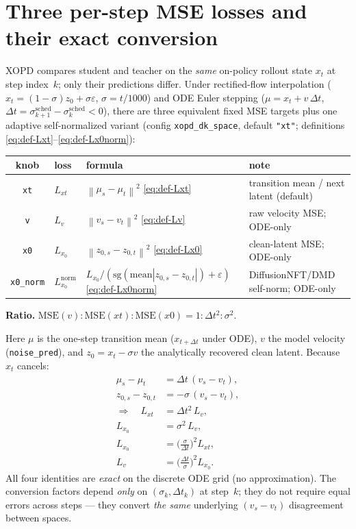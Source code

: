 \documentclass[11pt,a4paper]{article}
\newcommand{\norm}[1]{\left\lVert #1 \right\rVert}
\newcommand{\dt}{\Delta t}
\begin{document}
\section{Three per-step MSE losses and their exact conversion}
\label{sec:three-losses}

XOPD compares student and teacher on the \emph{same} on-policy rollout state $x_t$ at step
index~$k$; only their predictions differ. Under rectified-flow interpolation
($x_t=(1-\sigma)z_0+\sigma\varepsilon$, $\sigma=t/1000$) and ODE Euler stepping
($\mu=x_t+v\,\dt$, $\dt=\sigma^{\mathrm{sched}}_{k+1}-\sigma^{\mathrm{sched}}_k<0$), there are
three equivalent fixed MSE targets plus one adaptive self-normalized variant (config
\texttt{xopd\_dk\_space}, default \texttt{"xt"}; definitions
\eqref{eq:def-Lxt}--\eqref{eq:def-Lx0norm}):

\begin{center}
\renewcommand{\arraystretch}{1.25}
\begin{tabular}{@{}clll@{}}
\toprule
\textbf{knob} & \textbf{loss} & \textbf{formula} & \textbf{note} \\
\midrule
\texttt{xt} & $L_{xt}$ & $\norm{\mu_s-\mu_t}^2$ \eqref{eq:def-Lxt} & transition mean / next latent (default) \\
\texttt{v} & $L_v$ & $\norm{v_s-v_t}^2$ \eqref{eq:def-Lv} & raw velocity MSE; ODE-only \\
\texttt{x0} & $L_{x_0}$ & $\norm{z_{0,s}-z_{0,t}}^2$ \eqref{eq:def-Lx0} & clean-latent MSE; ODE-only \\
\texttt{x0\_norm} & $L_{x_0}^{\mathrm{norm}}$ & $L_{x_0}/(\mathrm{sg}(\mathrm{mean}|z_{0,s}-z_{0,t}|)+\varepsilon)$ \eqref{eq:def-Lx0norm} & DiffusionNFT/DMD self-norm; ODE-only \\
\bottomrule
\end{tabular}
\end{center}

\textbf{Ratio.} $\mathrm{MSE}(v):\mathrm{MSE}(xt):\mathrm{MSE}(x0) = 1:\dt^2:\sigma^2$.

Here $\mu$ is the one-step transition mean ($x_{t+\dt}$ under ODE), $v$ the model velocity
(\texttt{noise\_pred}), and $z_0=x_t-\sigma v$ the analytically recovered clean latent. Because
$x_t$ cancels:
\begin{align}
\mu_s-\mu_t &= \dt\,(v_s-v_t),
\label{eq:mu-v}\\
z_{0,s}-z_{0,t} &= -\sigma\,(v_s-v_t),
\label{eq:x0-v}\\
\Rightarrow\quad
L_{xt} &= \dt^2\,L_v,
\label{eq:mu-v-sq}\\
L_{x_0} &= \sigma^2\,L_v,
\label{eq:x0-v-sq}\\
L_{x_0} &= \Big(\tfrac{\sigma}{\dt}\Big)^2 L_{xt},
\label{eq:x0-mu}\\
L_v &= \Big(\tfrac{\dt}{\sigma}\Big)^2 L_{x_0}.
\label{eq:v-x0}
\end{align}
All four identities are \emph{exact} on the discrete ODE grid (no approximation). The conversion
factors depend \emph{only} on $(\sigma_k,\dt_k)$ at step~$k$; they do not require equal errors
across steps --- they convert \emph{the same} underlying $(v_s-v_t)$ disagreement between spaces.
\end{document}

